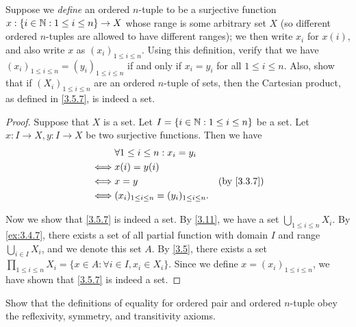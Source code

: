 \begin{ex}\label{ex:3.5.2}
  Suppose we \emph{define} an ordered \(n\)-tuple to be a surjective function \(x : \{i \in \mathbb{N} : 1 \leq i \leq n\} \to X\) whose range is some arbitrary set \(X\) (so different ordered \(n\)-tuples are allowed to have different ranges);
  we then write \(x_i\) for \(x(i)\), and also write \(x\) as \((x_i)_{1 \leq i \leq n}\).
  Using this definition, verify that we have \((x_i)_{1 \leq i \leq n} = (y_i)_{1 \leq i \leq n}\) if and only if \(x_i = y_i\) for all \(1 \leq i \leq n\).
  Also, show that if \((X_i)_{1 \leq i \leq n}\) are an ordered \(n\)-tuple of sets, then the Cartesian product, as defined in \cref{3.5.7}, is indeed a set.
\end{ex}

\begin{proof}
  Suppose that \(X\) is a set.
  Let \(I = \{i \in \mathbb{N} : 1 \leq i \leq n\}\) be a set.
  Let \(x : I \to X, y : I \to X\) be two surjective functions.
  Then we have
  \begin{align*}
         & \forall 1 \leq i \leq n : x_i = y_i                                           \\
    \iff & x(i) = y(i)                                                                   \\
    \iff & x = y                                              & \text{(by \cref{3.3.7})} \\
    \iff & (x_i)_{1 \leq i \leq n} = (y_i)_{1 \leq i \leq n}.
  \end{align*}

  Now we show that \cref{3.5.7} is indeed a set.
  By \cref{3.11}, we have a set \(\bigcup_{1 \leq i \leq n} X_i\).
  By \cref{ex:3.4.7}, there exists a set of all partial function with domain \(I\) and range \(\bigcup_{i \in I} X_i\), and we denote this set \(A\).
  By \cref{3.5}, there exists a set \(\prod_{1 \leq i \leq n} X_i = \{x \in A : \forall i \in I, x_i \in X_i\}\).
  Since we define \(x = (x_i)_{1 \leq i \leq n}\), we have shown that \cref{3.5.7} is indeed a set.
\end{proof}

\begin{ex}\label{ex:3.5.3}
  Show that the definitions of equality for ordered pair and ordered \(n\)-tuple obey the reflexivity, symmetry, and transitivity axioms.
\end{ex}

